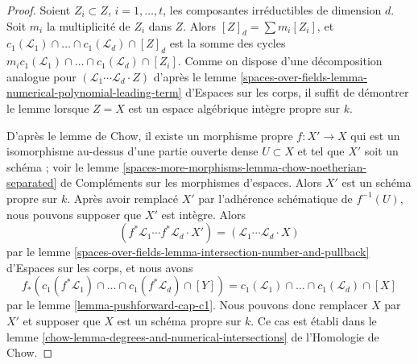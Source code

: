 \begin{proof}
Soient $Z_i \subset Z$, $i = 1, \ldots, t$, les composantes irréductibles de
dimension $d$. Soit $m_i$ la multiplicité de $Z_i$ dans $Z$. Alors $[Z]_d =
\sum m_i[Z_i]$, et $c_1(\mathcal{L}_1) \cap \ldots \cap c_1(\mathcal{L}_d)
\cap [Z]_d$ est la somme des cycles $m_i c_1(\mathcal{L}_1) \cap \ldots \cap
c_1(\mathcal{L}_d) \cap [Z_i]$. Comme on dispose d'une décomposition analogue
pour $(\mathcal{L}_1 \cdots \mathcal{L}_d \cdot Z)$ d'après le lemme
\ref{spaces-over-fields-lemma-numerical-polynomial-leading-term} d'Espaces sur
les corps, il suffit de démontrer le lemme lorsque $Z = X$ est un espace
algébrique intègre propre sur $k$.

\medskip\noindent
D'après le lemme de Chow, il existe un morphisme propre $f : X' \to X$ qui est
un isomorphisme au-dessus d'une partie ouverte dense $U \subset X$ et tel que
$X'$ soit un schéma ; voir le lemme
\ref{spaces-more-morphisms-lemma-chow-noetherian-separated} de Compléments sur
les morphismes d'espaces. Alors $X'$ est un schéma propre sur $k$. Après avoir
remplacé $X'$ par l'adhérence schématique de $f^{-1}(U)$, nous pouvons supposer
que $X'$ est intègre. Alors
$$
(f^*\mathcal{L}_1 \cdots f^*\mathcal{L}_d \cdot X') =
(\mathcal{L}_1 \cdots \mathcal{L}_d \cdot X)
$$
par le lemme \ref{spaces-over-fields-lemma-intersection-number-and-pullback}
d'Espaces sur les corps, et nous avons
$$
f_*(c_1(f^*\mathcal{L}_1) \cap \ldots \cap c_1(f^*\mathcal{L}_d) \cap [Y]) =
c_1(\mathcal{L}_1) \cap \ldots \cap c_1(\mathcal{L}_d) \cap [X]
$$
par le lemme \ref{lemma-pushforward-cap-c1}. Nous pouvons donc remplacer $X$
par $X'$ et supposer que $X$ est un schéma propre sur $k$. Ce cas est établi
dans le lemme \ref{chow-lemma-degrees-and-numerical-intersections} de
l'Homologie de Chow.
\end{proof}





















